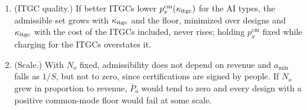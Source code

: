 \begin{proposition}
\begin{enumerate}
\item[(e)] (ITGC quality.) If better ITGCs lower $p^{\mathrm{cm}}_x(\kappa_{\rm itgc})$ for the AI types, the admissible set grows with $\kappa_{\rm itgc}$ and the floor, minimized over designs and $\kappa_{\rm itgc}$ with the cost of the ITGCs included, never rises; holding $p^{\mathrm{cm}}_x$ fixed while charging for the ITGCs overstates it.
\item[(f)] (Scale.) With $N_o$ fixed, admissibility does not depend on revenue and $a_{\min}$ falls as $1/S$, but not to zero, since certifications are signed by people. If $N_o$ grew in proportion to revenue, $\bar P_o$ would tend to zero and every design with a positive common-mode floor would fail at some scale.
\end{enumerate}
\end{proposition}

